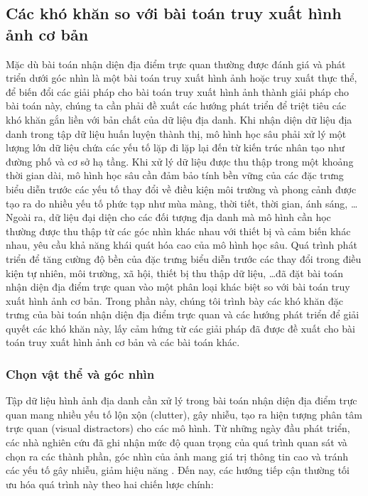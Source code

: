 \subsection{Các khó khăn so với bài toán truy xuất hình ảnh cơ bản}

Mặc dù bài toán nhận diện địa điểm trực quan thường được đánh giá và phát triển dưới góc nhìn là một bài toán truy xuất hình ảnh hoặc truy xuất thực thể, để biến đổi các giải pháp cho bài toán truy xuất hình ảnh thành giải pháp cho bài toán này, chúng ta cần phải đề xuất các hướng phát triển để triệt tiêu các khó khăn gắn liền với bản chất của dữ liệu địa danh. Khi nhận diện dữ liệu địa danh trong tập dữ liệu huấn luyện thành thị, mô hình học sâu phải xử lý một lượng lớn dữ liệu chứa các yếu tố lặp đi lặp lại đến từ kiến trúc nhân tạo như đường phố và cơ sở hạ tầng. Khi xử lý dữ liệu được thu thập trong một khoảng thời gian dài, mô hình học sâu cần đảm bảo tính bền vững của các đặc trưng biểu diễn trước các yếu tố thay đổi về điều kiện môi trường và phong cảnh được tạo ra do nhiều yếu tố phức tạp như mùa màng, thời tiết, thời gian, ánh sáng, \dots Ngoài ra, dữ liệu đại diện cho các đối tượng địa danh mà mô hình cần học thường được thu thập từ các góc nhìn khác nhau với thiết bị và cảm biến khác nhau, yêu cầu khả năng khái quát hóa cao của mô hình học sâu. Quá trình phát triển để tăng cường độ bền của đặc trưng biểu diễn trước các thay đổi trong điều kiện tự nhiên, môi trường, xã hội, thiết bị thu thập dữ liệu, \dots đã đặt bài toán nhận diện địa điểm trực quan vào một phân loại khác biệt so với bài toán truy xuất hình ảnh cơ bản. Trong phần này, chúng tôi trình bày các khó khăn đặc trưng của bài toán nhận diện địa điểm trực quan và các hướng phát triển để giải quyết các khó khăn này, lấy cảm hứng từ các giải pháp đã được đề xuất cho bài toán truy xuất hình ảnh cơ bản và các bài toán khác.

\subsubsection{Chọn vật thể và góc nhìn}

Tập dữ liệu hình ảnh địa danh cần xử lý trong bài toán nhận diện địa điểm trực quan mang nhiều yếu tố lộn xộn (clutter), gây nhiễu, tạo ra hiện tượng phân tâm trực quan (visual distractors) cho các mô hình. Từ những ngày đầu phát triển, các nhà nghiên cứu đã ghi nhận mức độ quan trọng của quá trình quan sát và chọn ra các thành phần, góc nhìn của ảnh mang giá trị thông tin cao và tránh các yếu tố gây nhiễu, giảm hiệu năng \cite{4270175, knopp2010avoiding, predicting-good-features, Torii2013VisualPR, arandjelovic2015dislocation}. Đến nay, các hướng tiếp cận thường tối ưu hóa quá trình này theo hai chiến lược chính:

